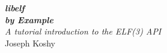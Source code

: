 \pagestyle{empty}
\raggedleft
\vspace*{\baselineskip}
{\Huge \itshape {\bfseries libelf} \\[0.2\baselineskip]
 \itshape \bfseries by Example}\\[2.2\baselineskip]
{\LARGE\itshape A tutorial introduction to the ELF(3) API}\\[0.25\textheight]
{\LARGE Joseph Koshy}\par
\vfill
